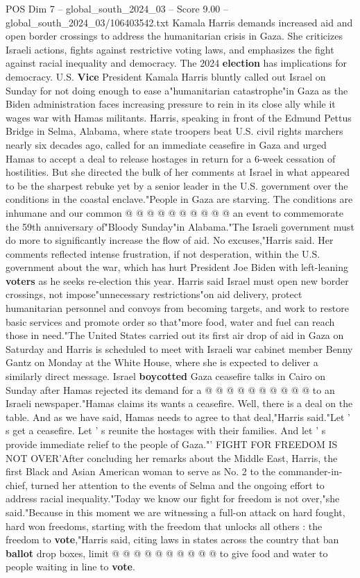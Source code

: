 \begin{textsample}{POS Dim 7 – global\_south\_2024\_03 – Score 9.00 – global\_south\_2024\_03/106403542.txt}  \label{ex:f7_pos_159}
Kamala Harris demands increased aid and open border crossings to address the humanitarian crisis in Gaza.
She criticizes Israeli actions, fights against restrictive voting laws, and emphasizes the fight against racial inequality and democracy.
The 2024 \textbf{election} has implications for democracy.
U.S. \textbf{Vice} President Kamala Harris bluntly called out Israel on Sunday for not doing enough to ease a"humanitarian catastrophe"in Gaza as the Biden administration faces increasing pressure to rein in its close ally while it wages war with Hamas militants.
Harris, speaking in front of the Edmund Pettus Bridge in Selma, Alabama, where state troopers beat U.S. civil rights marchers nearly six decades ago, called for an immediate ceasefire in Gaza and urged Hamas to accept a deal to release hostages in return for a 6-week cessation of hostilities.
But she directed the bulk of her comments at Israel in what appeared to be the sharpest rebuke yet by a senior leader in the U.S. government over the conditions in the coastal enclave."People in Gaza are starving.
The conditions are inhumane and our common @ @ @ @ @ @ @ @ @ @ an event to commemorate the 59th anniversary of"Bloody Sunday"in Alabama."The Israeli government must do more to significantly increase the flow of aid.
No excuses,"Harris said.
Her comments reflected intense frustration, if not desperation, within the U.S. government about the war, which has hurt President Joe Biden with left-leaning \textbf{voters} as he seeks re-election this year.
Harris said Israel must open new border crossings, not impose"unnecessary restrictions"on aid delivery, protect humanitarian personnel and convoys from becoming targets, and work to restore basic services and promote order so that"more food, water and fuel can reach those in need."The United States carried out its first air drop of aid in Gaza on Saturday and Harris is scheduled to meet with Israeli war cabinet member Benny Gantz on Monday at the White House, where she is expected to deliver a similarly direct message.
Israel \textbf{boycotted} Gaza ceasefire talks in Cairo on Sunday after Hamas rejected its demand for a @ @ @ @ @ @ @ @ @ @ to an Israeli newspaper."Hamas claims its wants a ceasefire.
Well, there is a deal on the table.
And as we have said, Hamas needs to agree to that deal,"Harris said."Let ' s get a ceasefire.
Let ' s reunite the hostages with their families.
And let ' s provide immediate relief to the people of Gaza."' FIGHT FOR FREEDOM IS NOT OVER'After concluding her remarks about the Middle East, Harris, the first Black and Asian American woman to serve as No. 2 to the commander-in-chief, turned her attention to the events of Selma and the ongoing effort to address racial inequality."Today we know our fight for freedom is not over,"she said."Because in this moment we are witnessing a full-on attack on hard fought, hard won freedoms, starting with the freedom that unlocks all others : the freedom to \textbf{vote},"Harris said, citing laws in states across the country that ban \textbf{ballot} drop boxes, limit @ @ @ @ @ @ @ @ @ @ to give food and water to people waiting in line to \textbf{vote}.

\end{textsample}
